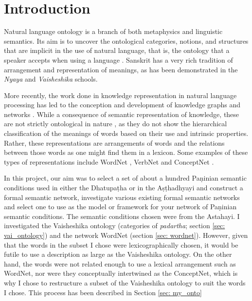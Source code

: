 \documentclass[final, 12pt]{elsarticle}
\begin{document}
\section{Introduction}
\label{intro}

Natural language ontology is a branch of both metaphysics and linguistic semantics. Its aim is to uncover the ontological categories, notions, and structures that are implicit in the use of natural language, that is, the ontology that a speaker accepts when using a language \cite{moltmann2017natural}. Sanskrit has a very rich tradition of arrangement and representation of meanings, as has been demonstrated in the \emph{Nyaya} and \emph{Vaisheshika} schools.

More recently, the work done in knowledge representation in natural language processing has led to the conception and development of knowledge graphs and networks \citep{huang2010ontology}. While a consequence of semantic representation of knowledge, these are not strictly ontological in nature \citep{bateman1997theoretical}, as they do not show the hierarchical classification of the meanings of words based on their use and intrinsic properties. Rather, these representations are arrangements of words and the relations between those words as one might find them in a lexicon. Some examples of these types of representations include WordNet \citep{miller1995wordnet}, VerbNet \citep{schuler2005verbnet} and ConceptNet \citep{liu2004conceptnet}.

In this project, our aim was to select a set of about a hundred Paṇinian semantic conditions used in either the Dhatupaṭha or in the Aṣṭhadhyayi and construct a formal semantic network, investigate various existing formal semantic networks and select one to use as the model or framework for your network of Paṇinian semantic conditions. The semantic conditions chosen were from the Astahayi. I investigated the Vaisheshika ontology (categories of \emph{padartha}; section \ref{sec: vai_ontology}) and the network WordNet (section \ref{sec: wordnet}). However, given that the words in the subset I chose were lexicographically chosen, it would be futile to use a description as large as the Vaisheshika ontology. On the other hand, the words were not related enough to use a lexical arrangement such as WordNet, nor were they conceptually intertwined as the ConceptNet, which is why I chose to restructure a subset of the Vaisheshika ontology to suit the words I chose. This process has been described in Section \ref{sec: my_onto}
\end{document}

